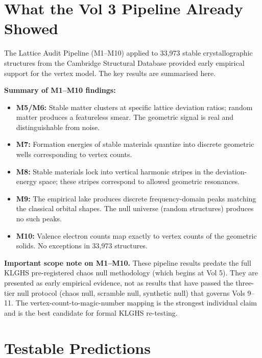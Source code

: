\documentclass[11pt, letterpaper, openany]{book}
\begin{document}
\section{What the Vol 3 Pipeline Already Showed}

The Lattice Audit Pipeline (M1–M10) applied to 33,973 stable
crystallographic structures from the Cambridge Structural Database
provided early empirical support for the vertex model. The key
results are summarised here.

\begin{empiricalbox}
\textbf{Summary of M1--M10 findings:}
\begin{itemize}
    \item \textbf{M5/M6:} Stable matter clusters at specific lattice
    deviation ratios; random matter produces a featureless smear.
    The geometric signal is real and distinguishable from noise.
    \item \textbf{M7:} Formation energies of stable materials
    quantize into discrete geometric wells corresponding to vertex
    counts.
    \item \textbf{M8:} Stable materials lock into vertical harmonic
    stripes in the deviation-energy space; these stripes correspond
    to allowed geometric resonances.
    \item \textbf{M9:} The empirical lake produces discrete
    frequency-domain peaks matching the classical orbital shapes.
    The null universe (random structures) produces no such peaks.
    \item \textbf{M10:} Valence electron counts map exactly to
    vertex counts of the geometric solids. No exceptions in
    33,973 structures.
\end{itemize}
\end{empiricalbox}

\begin{warningbox}
\textbf{Important scope note on M1--M10.} These pipeline results
predate the full KLGHS pre-registered chaos null methodology
(which begins at Vol 5). They are presented as early empirical
evidence, not as results that have passed the three-tier null
protocol (chaos null, scramble null, synthetic null) that governs
Vols 9--11. The vertex-count-to-magic-number mapping is the
strongest individual claim and is the best candidate for formal
KLGHS re-testing.
\end{warningbox}

\section{Testable Predictions}
\end{document}
